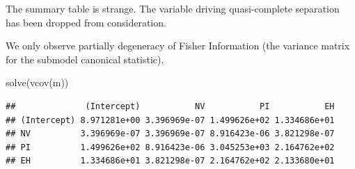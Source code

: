 \documentclass[
  ignorenonframetext,
]{beamer}
\newenvironment{Shaded}{\begin{snugshade}}{\end{snugshade}}
\newcommand{\FunctionTok}[1]{\textcolor[rgb]{0.00,0.00,0.00}{#1}}
\newcommand{\NormalTok}[1]{#1}
\begin{document}
\begin{frame}[fragile]{}
\protect\hypertarget{section-19}{}
The summary table is strange. The variable driving quasi-complete
separation has been dropped from consideration.

\vspace{12pt}

We only observe partially degeneracy of Fisher Information (the variance
matrix for the submodel canonical statistic).

\vspace{12pt}
\tiny

\begin{Shaded}
\begin{Highlighting}[]
\FunctionTok{solve}\NormalTok{(}\FunctionTok{vcov}\NormalTok{(m))}
\end{Highlighting}
\end{Shaded}

\begin{verbatim}
##              (Intercept)           NV           PI           EH
## (Intercept) 8.971281e+00 3.396969e-07 1.499626e+02 1.334686e+01
## NV          3.396969e-07 3.396969e-07 8.916423e-06 3.821298e-07
## PI          1.499626e+02 8.916423e-06 3.045253e+03 2.164762e+02
## EH          1.334686e+01 3.821298e-07 2.164762e+02 2.133680e+01
\end{verbatim}
\end{frame}
\end{document}
